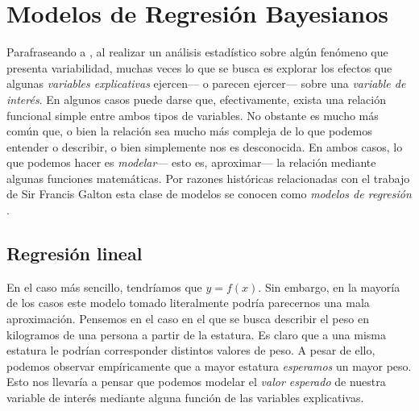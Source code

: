 \chapter{Modelos de Regresión Bayesianos}

Parafraseando a \textcite{DraperSmith98}, al realizar un análisis estadístico sobre algún fenómeno que presenta variabilidad, muchas veces lo que se busca es explorar los efectos que algunas \textit{variables explicativas} ejercen--- o parecen ejercer--- sobre una \textit{variable de interés}. En algunos casos puede darse que, efectivamente, exista una relación funcional simple entre ambos tipos de variables. No obstante es mucho más común que, o bien la relación sea mucho más compleja de lo que podemos entender o describir, o bien simplemente nos es desconocida. En ambos casos, lo que podemos hacer es \textit{modelar}--- esto es, aproximar--- la relación mediante algunas funciones matemáticas. Por razones históricas relacionadas con el trabajo de Sir Francis Galton esta clase de modelos se conocen como \textit{modelos de regresión} \parencite{Zepeda15}. 

\section{Regresión lineal} 
 
En el caso más sencillo, tendríamos que $y=f(x)$. Sin embargo, en la mayoría de los casos este modelo tomado literalmente podría parecernos una mala aproximación. Pensemos en el caso en el que se busca describir el peso en kilogramos de una persona a partir de la estatura. Es claro que a una misma estatura le podrían corresponder distintos valores de peso. A pesar de ello, podemos observar empíricamente que a mayor estatura \textit{esperamos} un mayor peso. Esto nos llevaría a pensar que podemos modelar el \textit{valor esperado} de nuestra variable de interés mediante alguna función de las variables explicativas.\\

